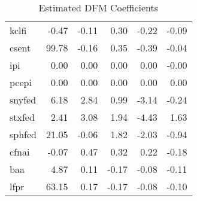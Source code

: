 \documentclass[11pt, letterpaper]{article}\usepackage[]{graphicx}\usepackage[]{color}
\begin{document}
\begin{table}[H]
\begin{tabular}{lrrrrr}
  kclfi & -0.47 & -0.11 & 0.30 & -0.22 & -0.09 \\ 
  csent & 99.78 & -0.16 & 0.35 & -0.39 & -0.04 \\ 
  ipi & 0.00 & 0.00 & 0.00 & 0.00 & -0.00 \\ 
  pcepi & 0.00 & 0.00 & 0.00 & 0.00 & 0.00 \\ 
  snyfed & 6.18 & 2.84 & 0.99 & -3.14 & -0.24 \\ 
  stxfed & 2.41 & 3.08 & 1.94 & -4.43 & 1.63 \\ 
  sphfed & 21.05 & -0.06 & 1.82 & -2.03 & -0.94 \\ 
  cfnai & -0.07 & 0.47 & 0.32 & 0.22 & -0.18 \\ 
  baa & 4.87 & 0.11 & -0.17 & -0.08 & -0.11 \\ 
  lfpr & 63.15 & 0.17 & -0.17 & -0.08 & -0.10 \\ 
   \hline
\end{tabular}
\endgroup
\caption{Estimated DFM Coefficients} 
\end{table}
\end{document}

